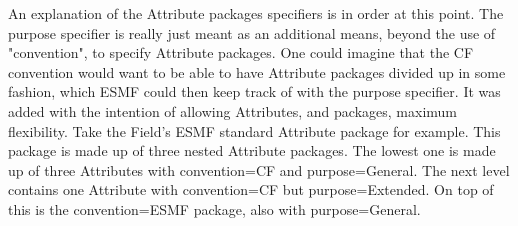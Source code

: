 An explanation of the Attribute packages specifiers is in order at this point.  The purpose specifier is really just meant as an additional means, beyond the use of "convention", to specify Attribute packages.  One could imagine that the CF convention would want to be able to have Attribute packages divided up in some fashion, which ESMF could then keep track of with the purpose specifier.  It was added with the intention of allowing Attributes, and packages, maximum flexibility.  Take the Field's ESMF standard Attribute package for example.  This package is made up of three nested Attribute packages.  The lowest one is made up of three Attributes with convention=CF and purpose=General.  The next level contains one Attribute with convention=CF but purpose=Extended.  On top of this is the convention=ESMF package, also with purpose=General.
